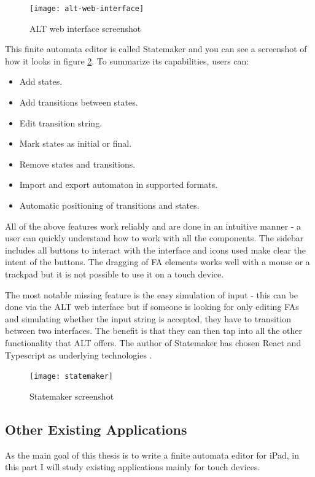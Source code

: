 \begin{figure}
    \texttt{[image: alt-web-interface]}
    \caption{ALT web interface screenshot}\label{alt-web-interface-screen}
\end{figure}

This finite automata editor is called Statemaker and you can see a screenshot of how it looks in figure \ref{statemaker-screen}. To summarize its capabilities, users can:
\begin{itemize}
    \item Add states.
    \item Add transitions between states.
    \item Edit transition string.
    \item Mark states as initial or final.
    \item Remove states and transitions.
    \item Import and export automaton in supported formats.
    \item Automatic positioning of transitions and states.
\end{itemize}
All of the above features work reliably and are done in an intuitive manner - a user can quickly understand how to work with all the components. The sidebar includes all buttons to interact with the interface and icons used make clear the intent of the buttons. The dragging of FA elements works well with a mouse or a trackpad but it is not possible to use it on a touch device.

The most notable missing feature is the easy simulation of input - this can be done via the ALT web interface but if someone is looking for only editing FAs and simulating whether the input string is accepted, they have to transition between two interfaces. The benefit is that they can then tap into all the other functionality that ALT offers. The author of Statemaker has chosen React and Typescript as underlying technologies \cite{state-maker}.

\begin{figure}
    \texttt{[image: statemaker]}
    \caption{Statemaker screenshot}\label{statemaker-screen}
\end{figure}

\subsection{Other Existing Applications}

As the main goal of this thesis is to write a finite automata editor for iPad, in this part I will study existing applications mainly for touch devices. 

